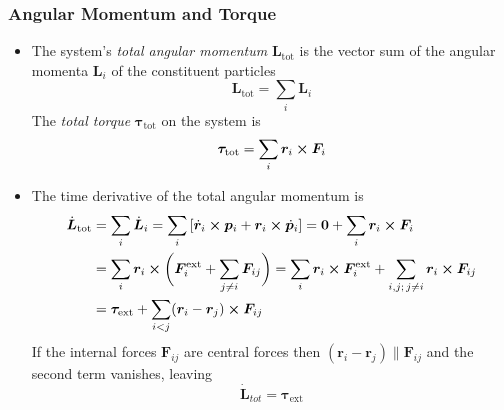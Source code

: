 \documentclass[11pt, a4paper]{article}
\newcommand{\bdot}[1]{\dot{\bm{#1}}}
\begin{document}
\subsubsection{Angular Momentum and Torque}
\begin{itemize}
	\item The system's \textit{total angular momentum} $ \bm{L}_{\text{tot}} $ is the vector sum of the angular momenta $ \bm{L}_{i} $ of the constituent particles
	\begin{equation*}
		\bm{L}_{\text{tot}} = \sum_{i}\bm{L}_{i}
	\end{equation*}
	The \textit{total torque} $ \bm{\tau}_{\text{tot}} $ on the system is
	\begin{equation*}
		\bm{\tau}_{\text{tot}} = \sum_{i} \bm{r}_{i} \cross \bm{F}_{i}
	\end{equation*}
	
	
	\item The time derivative of the total angular momentum is 
	\begin{align*}
		\bdot{L}_{\text{tot}} &= \sum_{i} \bdot{L}_{i} = \sum_{i} \left[\bdot{r}_{i} \cross \bm{p}_{i} + \bm{r}_{i} \cross \bdot{p}_{i}\right] = \bm{0} + \sum_{i}\bm{r}_{i} \cross \bm{F}_{i}\\
		&=\sum_{i} \bm{r}_{i} \cross \bigg(\bm{F}_{i}^{\text{ext}}  + \sum_{j\neq i}\bm{F}_{ij} \bigg) = \sum_{i} \bm{r}_{i} \cross \bm{F}_{i}^{\text{ext}} + \sum_{i, j; \, j \neq i} \bm{r}_{i} \cross \bm{F}_{ij}\\
		&= \bm{\tau}_{\text{ext}} + \sum_{i < j} (\bm{r}_{i} - \bm{r}_{j} ) \cross \bm{F}_{ij}
	\end{align*}
	If the internal forces $ \bm{F}_{ij} $ are central forces then $ (\bm{r}_{i} - \bm{r}_{j} ) \parallel \bm{F}_{ij} $ and the second term vanishes, leaving
	\begin{equation*}
		\bdot{L}_{tot} = \bm{\tau}_{\text{ext}}
	\end{equation*}

\end{itemize}
\end{document}
